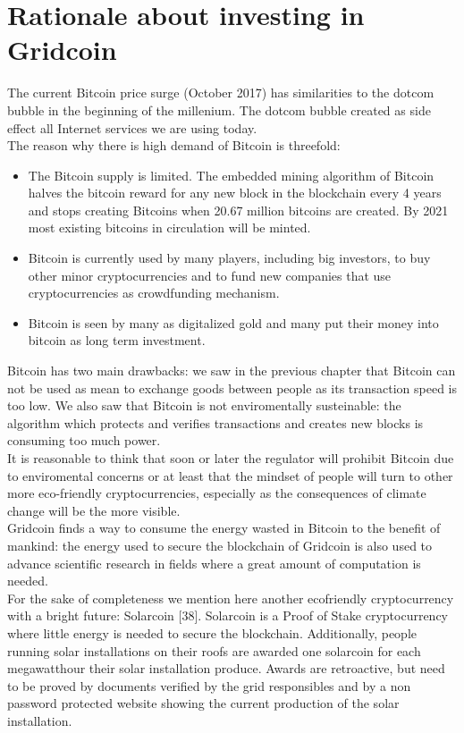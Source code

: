 \section{Rationale about investing in Gridcoin}

The current Bitcoin price surge (October 2017) has similarities to the dotcom bubble in the beginning of the millenium. The dotcom bubble created as side effect all Internet services we are using today.\\

The reason why there is high demand of Bitcoin is threefold:\\

\begin{itemize}
  	\item The Bitcoin supply is limited. The embedded mining algorithm of Bitcoin halves the bitcoin reward for any new block in the blockchain every 4 years and stops creating Bitcoins when 20.67 million bitcoins are created. By 2021 most existing bitcoins in circulation will be minted.
           \item Bitcoin is currently used by many players, including big investors, to buy other minor cryptocurrencies and to fund new companies that use cryptocurrencies as crowdfunding mechanism.
           \item Bitcoin is seen by many as digitalized gold and many put their money into bitcoin as long term investment.  
\end{itemize}

Bitcoin has two main drawbacks: we saw in the previous chapter that Bitcoin can not be used as mean to exchange goods between people as its transaction speed is too low. We also saw that Bitcoin is not enviromentally susteinable: the algorithm which protects and verifies transactions and creates new blocks is consuming too much power.\\

It is reasonable to think that soon or later the regulator will prohibit Bitcoin due to enviromental concerns or at least that the mindset of people will turn to other more eco-friendly cryptocurrencies, especially as the consequences of climate change will be the more visible.\\

Gridcoin finds a way to consume the energy wasted in Bitcoin to the benefit of mankind: the energy used to secure the blockchain of Gridcoin is also used to advance scientific research in fields where a great amount of computation is needed.\\

For the sake of completeness we mention here another ecofriendly cryptocurrency with a bright future: Solarcoin [38]. Solarcoin is a Proof of Stake cryptocurrency where little energy is needed to secure the blockchain. Additionally, people running solar installations on their roofs are awarded one solarcoin for each megawatthour their solar installation produce. Awards are retroactive, but need to be proved by documents verified by the grid responsibles and by a non password protected website showing the current production of the solar installation.\\